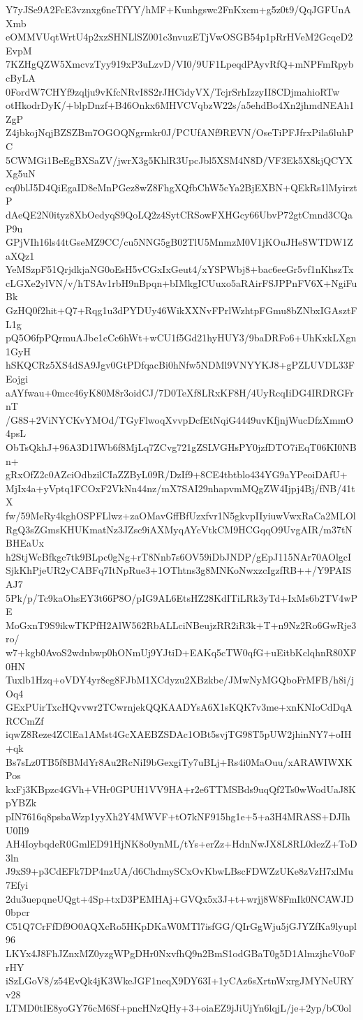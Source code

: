 Y7yJSe9A2FcE3vznxg6neTfYY/hMF+Kunhgswc2FnKxcm+g5z0t9/QqJGFUnAXmb
eOMMVUqtWrtU4p2xzSHNLlSZ001c3nvuzETjVwOSGB54p1pRrHVeM2GcqeD2EvpM
7KZHgQZW5XmcvzTyy919xP3uLzvD/VI0/9UF1LpeqdPAyvRfQ+mNPFmRpybcByLA
0FordW7CHYf9zqlju9vKfcNRvI8S2rJHCidyVX/TcjrSrhIzzyII8CDjmahioRTw
otHkodrDyK/+blpDnzf+B46Onkx6MHVCVqbzW22s/a5ehdBo4Xn2jhmdNEAh1ZgP
Z4jbkojNqjBZSZBm7OGOQNgrmkr0J/PCUfANf9REVN/OseTiPFJfrxPila6luhPC
5CWMGi1BeEgBXSaZV/jwrX3g5KhlR3UpcJbl5XSM4N8D/VF3Ek5X8kjQCYXXg5uN
eq0blJ5D4QiEgaID8eMnPGez8wZ8FhgXQfbChW5cYa2BjEXBN+QEkRs1lMyirztP
dAeQE2N0ityz8XbOedyqS9QoLQ2z4SytCRSowFXHGcy66UbvP72gtCmnd3CQaP9u
GPjVIh16ls44tGseMZ9CC/cu5NNG5gB02TlU5MnmzM0V1jKOuJHeSWTDW1ZaXQz1
YeMSzpF51QrjdkjaNG0oEsH5vCGxIxGeut4/xYSPWbj8+bac6eeGr5vf1nKhszTx
cLGXe2ylVN/v/hTSAv1rbH9nBpqn+bIMkgICUuxo5aRAirFSJPPnFV6X+NgiFuBk
GzHQ0f2hit+Q7+Rqg1u3dPYDUy46WikXXNvFPrlWzhtpFGmu8bZNbxIGAsztFL1g
pQ5O6fpPQrmuAJbe1cCc6hWt+wCU1f5Gd21hyHUY3/9baDRFo6+UhKxkLXgn1GyH
hSKQCRz5XS4dSA9Jgv0GtPDfqacBi0hNfw5NDMl9VNYYKJ8+gPZLUVDL33FEojgi
aAYfwau+0mcc46yK80M8r3oidCJ/7D0TeXf8LRxKF8H/4UyRcqIiDG4IRDRGFrnT
/G8S+2ViNYCKvYMOd/TGyFlwoqXvvpDcfEtNqiG4449uvKfjnjWucDfzXmmO4psL
ObTsQkhJ+96A3D1IWb6f8MjLq7ZCvg721gZSLVGHsPY0jzfDTO7iEqT06KI0NBn+
gRxOfZ2c0AZciOdbzilCIaZZByL09R/DzIf9+8CE4tbtblo434YG9aYPeoiDAfU+
MjIx4a+yVptq1FCOxF2VkNn44nz/mX7SAI29nhapvmMQgZW4Ijpj4Bj/fNB/41tX
fw/59MeRy4kghOSPFLlwz+zaOMavGffBfUzxfvr1N5gkvpIIyiuwVwxRaCa2MLOl
RgQ3sZGmsKHUKmatNz3JZsc9iAXMyqAYcVtkCM9HCGqqO9UvgAIR/m37tNBHEaUx
h2StjWcBfkgc7tk9BLpc0gNg+rT8Nnb7s6OV59iDbJNDP/gEpJ115NAr70AOlgcI
SjkKhPjeUR2yCABFq7ItNpRue3+1OThtns3g8MNKoNwxzcIgzfRB++/Y9PAISAJ7
5Pk/p/Tc9kaOhsEY3t66P8O/pIG9AL6EtsHZ28KdITiLRk3yTd+IxMs6b2TV4wPE
MoGxnT9S9ikwTKPfH2AlW562RbALLciNBeujzRR2iR3k+T+n9Nz2Ro6GwRje3ro/
w7+kgb0AvoS2wdnbwp0hONmUj9YJtiD+EAKq5cTW0qfG+uEitbKclqhnR80XF0HN
Tuxlb1Hzq+oVDY4yr8eg8FJbM1XCdyzu2XBzkbe/JMwNyMGQboFrMFB/h8i/jOq4
GExPUirTxcHQvvwr2TCwrnjekQQKAADYsA6X1sKQK7v3me+xnKNIoCdDqARCCmZf
iqwZ8Reze4ZClEa1AMst4GcXAEBZSDAc1OBt5svjTG98T5pUW2jhinNY7+oIH+qk
Bs7sLz0TB5f8BMdYr8Au2RcNiI9bGexgiTy7uBLj+Rs4i0MaOuu/xARAWIWXKPos
kxFj3KBpzc4GVh+VHr0GPUH1VV9HA+r2e6TTMSBds9uqQf2Ts0wWodUaJ8KpYBZk
pIN7616q8psbaWzp1yyXh2Y4MWVF+tO7kNF915hg1e+5+a3H4MRASS+DJIhU0Il9
AH4IoybqdeR0GmlED91HjNK8o0ynML/tYs+erZz+HdnNwJX8L8RL0dezZ+ToD3ln
J9xS9+p3CdEFk7DP4nzUA/d6ChdmySCxOvKbwLBscFDWZzUKe8zVzH7xlMu7Efyi
2du3uepqneUQgt+4Sp+txD3PEMHAj+GVQx5x3J+t+wrjj8W8FmIk0NCAWJD0bpcr
C51Q7CrFfDf9O0AQXcRo5HKpDKaW0MTl7isfGG/QIrGgWju5jGJYZfKa9lyupl96
LKYx4J8FhJZnxMZ0yzgWPgDHr0NxvfhQ9n2BmS1odGBaT0g5D1AlmzjhcV0oFrHY
iSzLGoV8/z54EvQk4jK3WkeJGF1neqX9DY63I+1yCAz6sXrtnWxrgJMYNeURYv28
LTMD0tIE8yoGY76cM6Sf+pncHNzQHy+3+oiaEZ9jJiUjYn6lqjL/je+2yp/bC0ol
